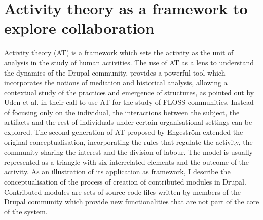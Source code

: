 \documentclass{sig-alternate}
\begin{document}
\section{Activity theory as a framework to explore collaboration}
Activity theory (AT) is a framework which sets the activity as the unit of analysis in the study of human activities. The use of AT as a lens to understand the dynamics of the Drupal community, provides a powerful tool which incorporates the notions of mediation and historical analysis, allowing a contextual study of the practices and emergence of structures, as pointed out by Uden et al.\cite{Uden2007} in their call to use AT for the study of FLOSS communities. Instead of focusing only on the individual, the interactions between the subject, the artifacts and the rest of individuals under certain organisational settings can be explored. The second generation of AT proposed by Engestr{\"o}m\cite{engestrom1987learning} extended the original conceptualisation, incorporating the rules that regulate the activity, the community sharing the interest and the division of labour. The model is usually represented as a triangle with six interrelated elements and the outcome of the activity. As an illustration of its application as framework, I describe the conceptualisation of the process of creation of contributed modules in Drupal. Contributed modules are sets of source code files written by members of the Drupal community which provide new functionalities that are not part of the core of the system.
\end{document}
